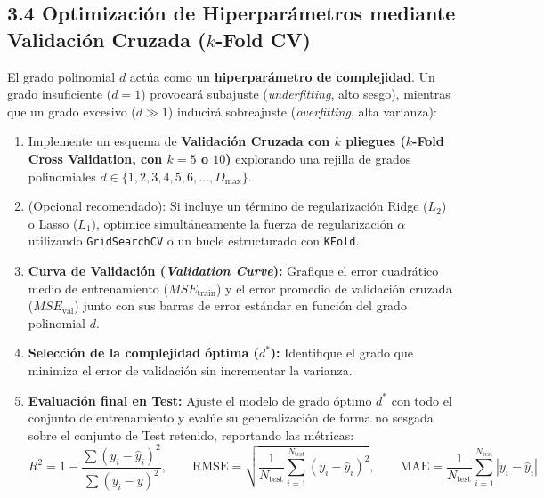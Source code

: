 \documentclass[11pt,a4paper]{article}
\begin{document}
\subsection{3.4 Optimización de Hiperparámetros mediante Validación Cruzada \texorpdfstring{($k$-Fold CV)}{(k-Fold CV)}}
El grado polinomial $d$ actúa como un \textbf{hiperparámetro de complejidad}. Un grado insuficiente ($d=1$) provocará subajuste (\textit{underfitting}, alto sesgo), mientras que un grado excesivo ($d \gg 1$) inducirá sobreajuste (\textit{overfitting}, alta varianza):
\begin{enumerate}[leftmargin=*,itemsep=3pt]
    \item Implemente un esquema de \textbf{Validación Cruzada con $k$ pliegues ($k$-Fold Cross Validation, con $k=5$ o $10$)} explorando una rejilla de grados polinomiales $d \in \{1, 2, 3, 4, 5, 6, \dots, D_{\max}\}$.
    \item (Opcional recomendado): Si incluye un término de regularización Ridge ($L_2$) o Lasso ($L_1$), optimice simultáneamente la fuerza de regularización $\alpha$ utilizando \texttt{GridSearchCV} o un bucle estructurado con \texttt{KFold}.
    \item \textbf{Curva de Validación (\textit{Validation Curve}):} Grafique el error cuadrático medio de entrenamiento ($MSE_{\text{train}}$) y el error promedio de validación cruzada ($MSE_{\text{val}}$) junto con sus barras de error estándar en función del grado polinomial $d$.
    \item \textbf{Selección de la complejidad óptima ($d^*$):} Identifique el grado que minimiza el error de validación sin incrementar la varianza.
    \item \textbf{Evaluación final en Test:} Ajuste el modelo de grado óptimo $d^*$ con todo el conjunto de entrenamiento y evalúe su generalización de forma no sesgada sobre el conjunto de Test retenido, reportando las métricas:
    \begin{equation}
        R^2 = 1 - \frac{\sum (y_i - \hat{y}_i)^2}{\sum (y_i - \bar{y})^2}, \qquad
        \text{RMSE} = \sqrt{\frac{1}{N_{\text{test}}} \sum_{i=1}^{N_{\text{test}}} (y_i - \hat{y}_i)^2}, \qquad
        \text{MAE} = \frac{1}{N_{\text{test}}} \sum_{i=1}^{N_{\text{test}}} |y_i - \hat{y}_i|
    \end{equation}
\end{enumerate}

\end{document}
